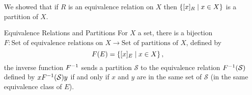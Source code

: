 \documentclass[class=article, crop=false]{standalone}
\begin{document}
  \begin{note}{}
    We showed that if $R$ is an equivalence relation on $X$ then $\left\{[x]_R\mid x\in X\right\}$ is a partition of $X$.
  \end{note}
  \begin{theorem}{Equivalence Relations and Partitions}
    For $X$ a set, there is a bijection $F\colon \text{Set of equivalence relations on $X$}\to \text{Set of partitions of $X$}$, defined by
    \[
      F(E) = \left\{[x]_E\mid x\in X\right\},
    \]
    the inverse function $F^{-1}$ sends a partition $\mathcal{S}$ to the equivalence relation $F^{-1}(\mathcal{S})$ defined by $xF^{-1}(\mathcal{S})y$ if and only if $x$ and $y$ are in the same set of $\mathcal{S}$ (in the same equivalence class of $E$).
  \end{theorem}
\end{document}
